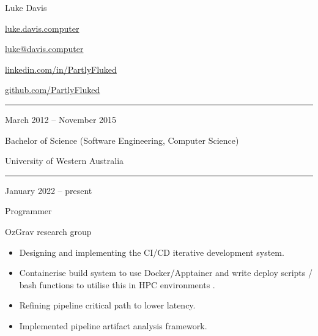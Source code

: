 \documentclass[a4paper,10pt]{article}
\newlength{\cvcolumngapwidth}
\newlength{\cvleftcolumnwidth}
\newlength{\cvrightcolumnwidth}
\newcommand{\cvnamestyle}[1]{{\Large\cvnamefont\textcolor{cvnamecolor}{#1}}}
\newcommand{\cvsectionstyle}[1]{{\normalsize\cvsectionfont\textcolor{cvsectioncolor}{#1}}}
\newcommand{\cvtitlestyle}[1]{{\large\cvtitlefont\textcolor{cvtitlecolor}{#1}}}
\newcommand{\cvdurationstyle}[1]{{\small\cvdurationfont\textcolor{cvdurationcolor}{#1}}}
\newlength{\cvafteritemskipamount}
\newlength{\cvaftersectionskipamount}
\newlength{\cvafternameskipamount}
\newlength{\cvafterpersonalinfolineskipamount}
\newlength{\cvaftertitleskipamount}
\newlength{\cvparskip}
\newcommand{\cvpersonalinfo}[2]{
    \begin{minipage}[t]{\cvleftcolumnwidth}
        \vspace{0mm} %
        \raggedleft #1
    \end{minipage}%
    \hspace{\cvcolumngapwidth}%
    \begin{minipage}[t]{\cvrightcolumnwidth}
        \vspace{0mm} %
        #2
    \end{minipage}

    \vspace{\cvafteritemskipamount}
}
\newcommand{\cvname}[1]{
    \cvnamestyle{#1}

    \vspace{\cvafternameskipamount}
}
\newcommand{\cvpersonalinfolinewithicon}[3]{
    \raisebox{.5\fontcharht\font`E-.5\height}{\texttt{[image: \#2]}}
    #3

    \vspace{\cvafterpersonalinfolineskipamount}
}
\newcommand{\cvsection}[1]{
    \begin{minipage}[t]{\cvleftcolumnwidth}
        \raggedleft\cvsectionstyle{#1}
    \end{minipage}%
    \hspace{\cvcolumngapwidth}%
    \begin{minipage}[t]{\cvrightcolumnwidth}
        \textcolor{cvrulecolor}{\rule{\cvrightcolumnwidth}{0.3mm}}
    \end{minipage}

    \vspace{\cvaftersectionskipamount}
}
\newcommand{\cvitem}[2]{
    \begin{minipage}[t]{\cvleftcolumnwidth}
        \raggedleft #1
    \end{minipage}%
    \hspace{\cvcolumngapwidth}%
    \begin{minipage}[t]{\cvrightcolumnwidth}
        \setlength{\parskip}{\cvparskip} #2
    \end{minipage}

    \vspace{\cvafteritemskipamount}
}
\newcommand{\cvtitle}[1]{
    \cvtitlestyle{#1}

    \vspace{\cvaftertitleskipamount}
    \vspace{-\cvparskip}
}
\begin{document}

\cvpersonalinfo{
    \cvname{Luke Davis}


    \cvpersonalinfolinewithicon{height=5mm}{website-icon.png}{
        \href{https://luke.davis.computer}{luke.davis.computer}
    }

    \cvpersonalinfolinewithicon{height=5mm}{070-envelop.pdf}{
        \href{mailto:luke@davis.computer}{luke@davis.computer}
    }
}{
    
    \vspace{7.6mm plus 1.25mm minus 1.25mm}

    \cvpersonalinfolinewithicon{height=5mm}{458-linkedin.pdf}{
        \href{https://linkedin.com/in/PartlyFluked}{linkedin.com/in/PartlyFluked}
    }
    
    \cvpersonalinfolinewithicon{height=5mm}{GitHub-Mark-32px.png}{
        \href{https://github.com/PartlyFluked}{github.com/PartlyFluked}
    }
}


\cvsection{EDUCATION}

\cvitem{
    \cvdurationstyle{March 2012 -- November 2015}
}{
    \cvtitle{Bachelor of Science (Software Engineering, Computer Science)}

    University of Western Australia
}


\cvsection{WORK EXPERIENCE}

\cvitem{
    \cvdurationstyle{January 2022 -- present}
}{
    \cvtitle{Programmer}

    OzGrav research group

    \begin{itemize}[leftmargin=*]
        \item Designing and implementing the CI/CD iterative development system.
        \item Containerise build system to use Docker/Apptainer and write deploy scripts / bash functions to utilise this in HPC environments .
        \item Refining pipeline critical path to lower latency.
        \item Implemented pipeline artifact analysis framework.
    \end{itemize}
}
\end{document}
